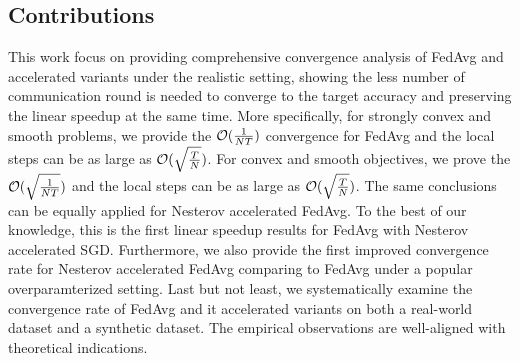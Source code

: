 \subsection{Contributions}
This work focus on providing comprehensive convergence analysis
of FedAvg and accelerated variants under the realistic setting, showing
the less number of communication round is needed to converge to the
target accuracy and preserving the linear speedup at the same time.
More specifically, for strongly convex and smooth problems, we provide the {\small{${\mathcal{O}}(\frac{1}{NT})$}} convergence  for FedAvg and the local steps can be as large as {\small{${\mathcal{O}}(\sqrt{\frac{T}{N}})$}}. For convex and smooth objectives, we prove the {\small{${\mathcal{O}}(\sqrt{\frac{1}{NT}})$}} and the local steps can be as large as {\small{${\mathcal{O}}(\sqrt{\frac{T}{N}})$}}. The same conclusions can be equally applied for Nesterov accelerated FedAvg. To the best of our knowledge, this is the first linear speedup results for FedAvg with Nesterov accelerated SGD. Furthermore, 
we also provide the first improved convergence rate for Nesterov accelerated FedAvg comparing to FedAvg under a popular overparamterized setting. 
Last but not least, we systematically examine the convergence rate of
FedAvg and it accelerated variants on both a real-world dataset and a synthetic dataset. The empirical observations are well-aligned with theoretical indications.








